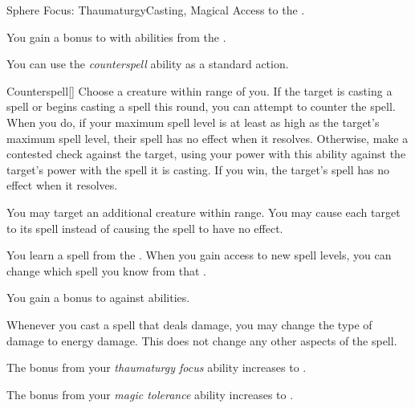     \begin{feat}{Sphere Focus: Thaumaturgy}{Casting, Magical}
        \featpre Access to the  .

         You gain a  bonus to  with abilities from the  .

         You can use the \textit{counterspell} ability as a standard action.
        \begin{freeability}{Counterspell}[]
            Choose a creature within \rngmed range of you.
            If the target is casting a spell or begins casting a spell this round, you can attempt to counter the spell.
            When you do, if your maximum spell level is at least as high as the target's maximum spell level, their spell has no effect when it resolves.
            Otherwise, make a contested  check against the target, using your power with this ability against the target's power with the spell it is casting.
            If you win, the target's spell has no effect when it resolves.

            \rankline
             You may target an additional creature within range.
             You may cause each target to  its spell instead of causing the spell to have no effect.
        \end{freeability}

         You learn a spell from the  .
        When you gain access to new spell levels, you can change which spell you know from that .

         You gain a  bonus to  against  abilities.

         Whenever you cast a spell that deals damage, you may change the type of damage to energy damage.
        This does not change any other aspects of the spell.

         The bonus from your \textit{thaumaturgy focus} ability increases to .

         The bonus from your \textit{magic tolerance} ability increases to .
    \end{feat}

